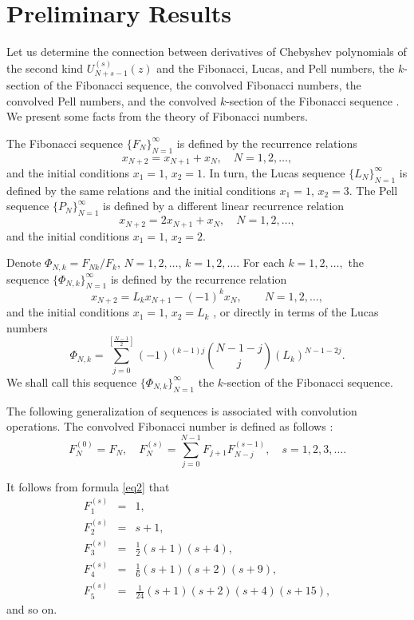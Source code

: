 \documentclass{article}
\begin{document}
\section{Preliminary Results}

Let us determine the connection between derivatives of Chebyshev polynomials of the second kind $U_{N + s - 1}^{(s)}(z)$ and the Fibonacci, Lucas, and Pell numbers, the $k$-section of the Fibonacci sequence, the convolved Fibonacci numbers, the convolved Pell numbers, and the convolved $k$-section of the Fibonacci sequence \cite{ref7, ref8}. We present some facts from the theory of Fibonacci numbers.

The Fibonacci sequence $\{F_N\}_{N = 1}^{\infty}$ is defined by the recurrence relations
$$
x_{N + 2} = x_{N + 1} + x_N, \quad N = 1,2,\ldots,
$$
and the initial conditions $x_1 = 1$, $x_2 = 1$. In turn, the Lucas sequence $\{L_N\}_{N = 1}^{\infty}$ is defined by the same relations and the initial conditions $x_1 = 1$, $x_2 = 3$. The Pell sequence $\{P_N\}_{N = 1}^{\infty}$ is defined by a different linear recurrence relation
$$
x_{N + 2} = 2x_{N + 1} + x_N, \quad N = 1,2,\ldots,
$$
and the initial conditions $x_1 = 1$, $x_2 = 2$.

Denote $\Phi_{N,k} = F_{Nk}/F_k$, $N = 1,2, \ldots$, $k = 1,2, \ldots$. For each $k = 1,2,\ldots,$ the sequence $\{\Phi_{N,k}\}_{N = 1}^{\infty}$ is defined by the recurrence relation
$$
x_{N + 2} = L_kx_{N+1} - (-1)^kx_N, \qquad N = 1,2,\ldots,
$$
and the initial conditions $x_1 = 1$, $x_2 = L_k$ \cite{ref8,ref9}, or directly in terms of the Lucas numbers \cite{ref10}
$$
\Phi_{N,k} = \sum_{j = 0}^{\left[\frac{N-1}{2}\right]}(-1)^{(k-1)j}{N - 1 - j \choose j}(L_k)^{N - 1 - 2j}.
$$
We shall call this sequence $\{\Phi_{N,k}\}_{N = 1}^{\infty}$ the $k$-section of the Fibonacci sequence.

The following generalization of sequences is associated with convolution operations. The convolved Fibonacci number is defined as follows \cite{ref7, ref10}:
\begin{equation}\label{eq2}
F_N^{(0)} = F_N, \quad F_N^{(s)} = \sum_{j = 0}^{N - 1}F_{j + 1}F_{N - j}^{(s - 1)}, \quad s = 1,2,3,\ldots.
\end{equation}

It follows from formula \eqref{eq2} that 
\begin{eqnarray*}
F_1^{(s)} &=& 1, \\
F_2^{(s)} &=& s + 1, \\
F_3^{(s)} &=& \frac{1}{2}(s + 1)(s + 4), \\
F_4^{(s)} &=& \frac{1}{6}(s + 1)(s + 2)(s + 9), \\
F_5^{(s)} &=& \frac{1}{24}(s + 1)(s + 2)(s + 4)(s + 15),
\end{eqnarray*}
and so on.
\end{document}
